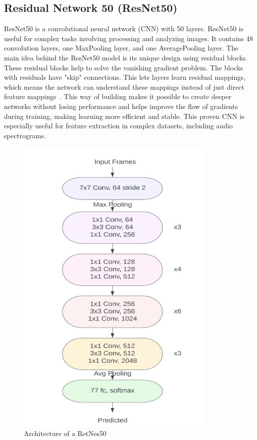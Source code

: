 \documentclass[12pt]{article}
\begin{document}
\subsection{Residual Network 50 (ResNet50)}
 ResNet50 is a convolutional neural network (CNN) with 50 layers. ResNet50 is useful for complex tasks involving processing and analyzing images. It contains 48 convolution layers, one MaxPooling layer, and one AveragePooling layer. The main idea behind the ResNet50 model is its unique design using residual blocks. These residual blocks help to solve the vanishing gradient problem. The blocks with residuals have "skip" connections. This lets layers learn residual mappings, which means the network can understand these mappings instead of just direct feature mappings~\cite{he2016deep}. This way of building makes it possible to create deeper networks without losing performance and helps improve the flow of gradients during training, making learning more efficient and stable. This proven CNN is especially useful for feature extraction in complex datasets, including audio spectrograms.
 
\begin{figure}[H]
    \centering
    \includegraphics[width=0.5\linewidth]{RetNes50.png}
    \caption{Architecture of a RetNes50~\cite{sehrawat2023deception}}
    \label{fig:ResNet50}
\end{figure}
\end{document}
